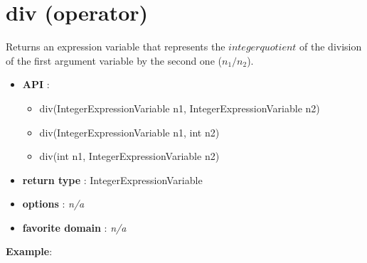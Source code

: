 \label{div}
\hypertarget{div}{}

\section{div (operator)}\label{div:divoperator}\hypertarget{div:divoperator}{}
Returns an expression variable that represents the \(integer quotient\) of the division of the first argument variable by the second one (\(n_1/n_2\)).

\begin{itemize}
	\item \textbf{API} :
	\begin{itemize}
		\item div(IntegerExpressionVariable n1, IntegerExpressionVariable n2)
		\item div(IntegerExpressionVariable n1, int n2)
		\item div(int n1, IntegerExpressionVariable n2)
	\end{itemize}
	\item \textbf{return type} : IntegerExpressionVariable
	\item \textbf{options} : \emph{n/a}
	\item \textbf{favorite domain} : \emph{n/a}
\end{itemize}

\textbf{Example}:

